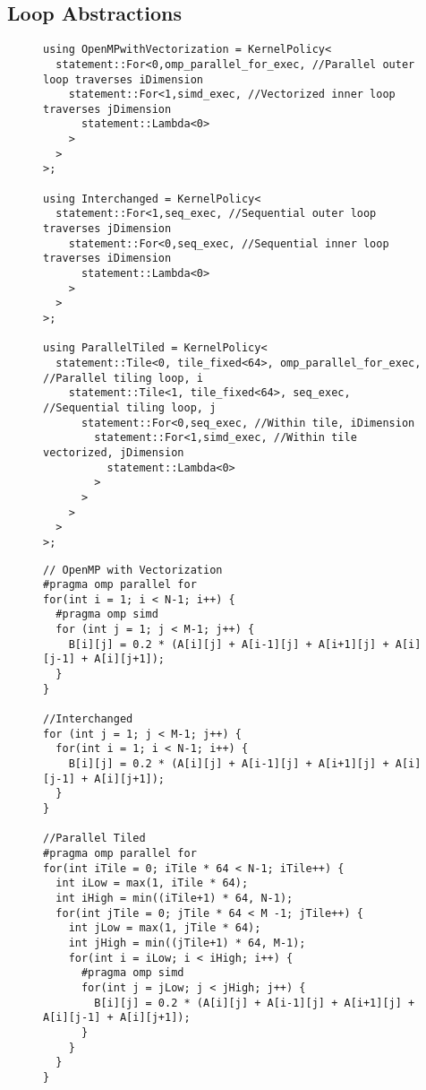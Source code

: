 \subsection{Loop Abstractions}

\begin{figure}
\begin{lstlisting}[caption={Kernel policies for different loop schedules.}, label={stencilSchedule}]
using OpenMPwithVectorization = KernelPolicy<
  statement::For<0,omp_parallel_for_exec, //Parallel outer loop traverses iDimension
    statement::For<1,simd_exec, //Vectorized inner loop traverses jDimension
      statement::Lambda<0>
    >
  >
>;

using Interchanged = KernelPolicy<
  statement::For<1,seq_exec, //Sequential outer loop traverses jDimension
    statement::For<0,seq_exec, //Sequential inner loop traverses iDimension
      statement::Lambda<0>
    >
  >
>;

using ParallelTiled = KernelPolicy<
  statement::Tile<0, tile_fixed<64>, omp_parallel_for_exec, //Parallel tiling loop, i
    statement::Tile<1, tile_fixed<64>, seq_exec, //Sequential tiling loop, j
      statement::For<0,seq_exec, //Within tile, iDimension
        statement::For<1,simd_exec, //Within tile vectorized, jDimension
          statement::Lambda<0>
        >
      >
    >
  >
>;
\end{lstlisting}
\end{figure}

\begin{figure}
\begin{lstlisting}[caption={Hand-changed loop schedules for C++ 5-point stencil computation.}, label={stencilScheduleCpp}]
// OpenMP with Vectorization
#pragma omp parallel for
for(int i = 1; i < N-1; i++) {
  #pragma omp simd
  for (int j = 1; j < M-1; j++) {
    B[i][j] = 0.2 * (A[i][j] + A[i-1][j] + A[i+1][j] + A[i][j-1] + A[i][j+1]);
  }
}

//Interchanged
for (int j = 1; j < M-1; j++) {
  for(int i = 1; i < N-1; i++) {
    B[i][j] = 0.2 * (A[i][j] + A[i-1][j] + A[i+1][j] + A[i][j-1] + A[i][j+1]);
  }
}

//Parallel Tiled
#pragma omp parallel for
for(int iTile = 0; iTile * 64 < N-1; iTile++) {
  int iLow = max(1, iTile * 64);
  int iHigh = min((iTile+1) * 64, N-1);
  for(int jTile = 0; jTile * 64 < M -1; jTile++) {
    int jLow = max(1, jTile * 64);
    int jHigh = min((jTile+1) * 64, M-1);
    for(int i = iLow; i < iHigh; i++) {
      #pragma omp simd
      for(int j = jLow; j < jHigh; j++) {
        B[i][j] = 0.2 * (A[i][j] + A[i-1][j] + A[i+1][j] + A[i][j-1] + A[i][j+1]);
      }
    }
  }
}
\end{lstlisting}
\end{figure}


